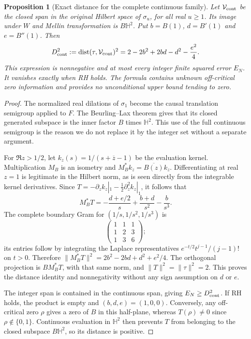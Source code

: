 \documentclass[11pt]{article}
\newtheorem{proposition}[theorem]{Proposition}
\theoremstyle{remark}
\begin{document}
\begin{proposition}[Exact distance for the complete continuous family]
\label{prop:ns76-continuous-distance}
Let $\mathcal V_{\rm cont}$ be the closed span in the original Hilbert
space of $\sigma_u$, for all real $u\geq1$. Its image under $W$ and
Mellin transformation is $B\mathbb H^2$.
Put $b=B(1)$, $d=B'(1)$ and $e=B''(1)$. Then
\begin{equation}
 D_{\rm cont}^2:=\operatorname{dist}(\tau,\mathcal V_{\rm cont})^2
 =2-2b^2+2bd-d^2-\frac{e^2}{4}.
 \label{eq:ns76-continuous-distance}
\end{equation}
This expression is nonnegative and at most every integer finite
squared error $E_N$. It vanishes exactly when RH holds.
The formula contains unknown off-critical zero information and
provides no unconditional upper bound tending to zero.
\end{proposition}
\begin{proof}
The normalized real dilations of $\sigma_1$ become the causal
translation semigroup applied to $F$. The Beurling--Lax theorem gives
that its closed generated subspace is the inner factor $B$ times
$\mathbb H^2$. This use of the full continuous semigroup is the reason
we do not replace it by the integer set without a separate argument.

For $\Re z>1/2$, let $k_z(s)=1/(s+\overline z-1)$ be the evaluation
kernel. Multiplication $M_B$ is an isometry and
$M_B^*k_z=\overline{B(z)}k_z$.
Differentiating at real $z=1$ is legitimate in the Hilbert norm,
as is seen directly from the integrable kernel derivatives. Since
$T=-\partial_z k_z|_1-\tfrac12\partial_z^2 k_z|_1$, it follows that
\[
 M_B^*T=-\frac{d+e/2}{s}+\frac{b+d}{s^2}-\frac{b}{s^3}.
\]
The complete boundary Gram for $(1/s,1/s^2,1/s^3)$ is
\[
 \begin{pmatrix}1&1&1\\1&2&3\\1&3&6\end{pmatrix};
\]
its entries follow by integrating the Laplace representatives
$e^{-t/2}t^{j-1}/(j-1)!$ on $t>0$.
Therefore $\|M_B^*T\|^2=2b^2-2bd+d^2+e^2/4$.
The orthogonal projection is $B M_B^*T$, with that same norm, and
$\|T\|^2=\|\tau\|^2=2$. This proves the distance identity and
nonnegativity without any sign assumption on $d$ or $e$.

The integer span is contained in the continuous span, giving
$E_N\geq D_{\rm cont}^2$. If RH holds, the product is empty and
$(b,d,e)=(1,0,0)$. Conversely, any off-critical zero $\rho$ gives a
zero of $B$ in this half-plane, whereas $T(\rho)\ne0$ since
$\rho\notin\{0,1\}$. Continuous evaluation in $\mathbb H^2$ then
prevents $T$ from belonging to the closed subspace $B\mathbb H^2$,
so its distance is positive.
\end{proof}
\end{document}
